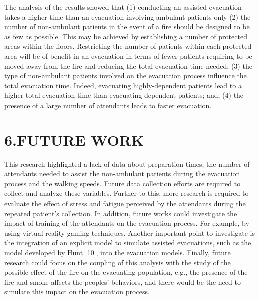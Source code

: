 \documentclass{style/llncs}
\begin{document}
The analysis of the results showed that (1) conducting an assisted evacuation
 takes a higher time than an evacuation involving ambulant patients only (2) 
 the number of non-ambulant patients in the event of a fire should be designed 
 to be as few as possible. This may be achieved by establishing a number of 
 protected areas within the floors. Restricting the number of patients within
  each protected area will be of benefit in an evacuation in terms of fewer 
  patients requiring to be moved away from the fire and reducing the total
   evacuation time needed; (3) the type of non-ambulant patients involved
    on the evacuation process influence the total evacuation time. Indeed, 
    evacuating highly-dependent patients lead to a higher total evacuation 
    time than evacuating dependent patients; and, (4) the presence of a
     large number of attendants leads to faster evacuation.%

\section{6.\hspace*{0.5em}FUTURE WORK}\label{sec-future-work}%

\noindent{}This research highlighted a lack of data about preparation times,
 the number of attendants needed to assist the non-ambulant patients
  during the evacuation process and the walking speeds. Future data 
  collection efforts are required to collect and analyze these variables.
   Further to this, more research is required to evaluate the effect of 
   stress and fatigue perceived by the attendants during the repeated 
   patient’s collection. In addition, future works could investigate 
   the impact of training of the attendants on the evacuation process.
    For example, by using virtual reality gaming techniques. Another
     important point to investigate is the integration of an explicit
      model to simulate assisted evacuations, such as the model 
      developed by Hunt [10], into the evacuation models. Finally,
       future research could focus on the coupling of this analysis
        with the study of the possible effect of the fire on the 
        evacuating population, e.g., the presence of the fire and 
        smoke affects the peoples’ behaviors, and there 
would be the need to simulate this impact on the evacuation process.%
\end{document}
